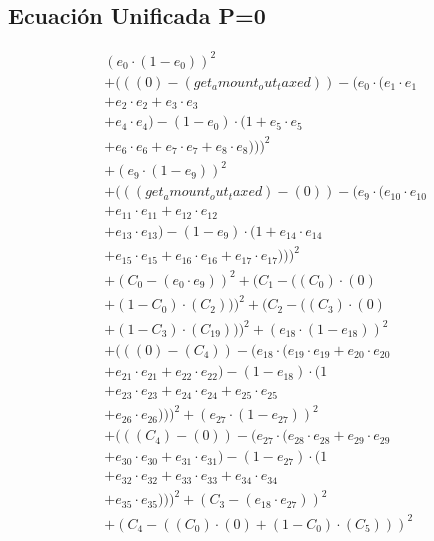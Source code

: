 \documentclass[10pt, a4paper]{article}
\begin{document}
\subsection*{Ecuación Unificada P=0}
\begin{align*}
& (e_{0} \cdot (1 - e_{0}))^{2} \\
& + (((0) - (get_amount_out_taxed)) - (e_{0} \cdot (e_{1} \cdot e_{1} \\
& + e_{2} \cdot e_{2} + e_{3} \cdot e_{3} \\
& + e_{4} \cdot e_{4}) - (1 - e_{0}) \cdot (1 + e_{5} \cdot e_{5} \\
& + e_{6} \cdot e_{6} + e_{7} \cdot e_{7} + e_{8} \cdot e_{8})))^{2} \\
& + (e_{9} \cdot (1 - e_{9}))^{2} \\
& + (((get_amount_out_taxed) - (0)) - (e_{9} \cdot (e_{10} \cdot e_{10} \\
& + e_{11} \cdot e_{11} + e_{12} \cdot e_{12} \\
& + e_{13} \cdot e_{13}) - (1 - e_{9}) \cdot (1 + e_{14} \cdot e_{14} \\
& + e_{15} \cdot e_{15} + e_{16} \cdot e_{16} + e_{17} \cdot e_{17})))^{2} \\
& + (C_{0} - (e_{0} \cdot e_{9}))^{2} + (C_{1} - ((C_{0})  \cdot  (0) \\
& + (1 - C_{0})  \cdot  (C_{2})))^{2} + (C_{2} - ((C_{3})  \cdot  (0) \\
& + (1 - C_{3})  \cdot  (C_{19})))^{2} + (e_{18} \cdot (1 - e_{18}))^{2} \\
& + (((0) - (C_{4})) - (e_{18} \cdot (e_{19} \cdot e_{19} + e_{20} \cdot e_{20} \\
& + e_{21} \cdot e_{21} + e_{22} \cdot e_{22}) - (1 - e_{18}) \cdot (1 \\
& + e_{23} \cdot e_{23} + e_{24} \cdot e_{24} + e_{25} \cdot e_{25} \\
& + e_{26} \cdot e_{26})))^{2} + (e_{27} \cdot (1 - e_{27}))^{2} \\
& + (((C_{4}) - (0)) - (e_{27} \cdot (e_{28} \cdot e_{28} + e_{29} \cdot e_{29} \\
& + e_{30} \cdot e_{30} + e_{31} \cdot e_{31}) - (1 - e_{27}) \cdot (1 \\
& + e_{32} \cdot e_{32} + e_{33} \cdot e_{33} + e_{34} \cdot e_{34} \\
& + e_{35} \cdot e_{35})))^{2} + (C_{3} - (e_{18} \cdot e_{27}))^{2} \\
& + (C_{4} - ((C_{0})  \cdot  (0) + (1 - C_{0})  \cdot  (C_{5})))^{2} \\

\end{align*}
\end{document}
